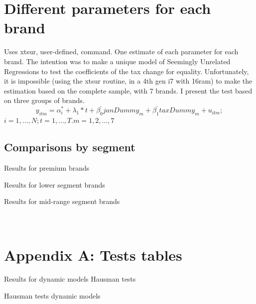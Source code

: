 \documentclass[]{article}
\begin{document}
\section{Different parameters for each brand}
Uses xtsur, user-defined, command.
One estimate of each parameter for each brand. 
The intention was to make a unique model of Seemingly Unrelated Regressions to test the coefficients of the tax change for equality. 
Unfortunately, it is impossible (using the xtsur routine, in a 4th gen i7 with 16ram) to make the estimation based on the complete sample, with 7 brands. I present the test based on three groups of brands.
\begin{equation*} 
	y_{itm}  = \alpha_{i}^{*} + \lambda_{1}*t +\beta_{0}^{'}janDummy_{m} + \beta_{1}^{'}taxDummy_{m} + u_{itm}
	;  
\end{equation*}
$i  = 1,\ldots,N;  t=1,\ldots,T. m = 1,2,\ldots,7$

\subsection{Comparisons by segment}
Results for premium brands



Results for lower segment brands



Results for mid-range segment brands




\appendix
\section{\\Appendix A: Tests tables}

Results for dynamic models Hausman tests

\begin{table}[ht]
	\centering

\caption{Hausman tests dynamic models \label{tab:AppendixHausman}} 


\end{table}
\end{document}

